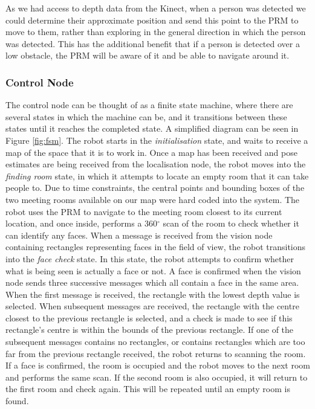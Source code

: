 \documentclass[conference]{IEEEtran}
\begin{document}
As we had access to depth data from the Kinect, when a person was detected we could determine their approximate position and send this point to the PRM to move to them, rather than exploring in the general direction in which the person was detected. This has the additional benefit that if a person is detected over a low obstacle, the PRM will be aware of it and be able to navigate around it.
\subsubsection{Control Node}
The control node can be thought of as a finite state machine, where there are several states in which the machine can be, and it transitions between these states until it reaches the completed state. A simplified diagram can be seen in Figure \ref{fig:fsm}. The robot starts in the \emph{initialisation} state, and waits to receive a map of the space that it is to work in. Once a map has been received and pose estimates are being received from the localisation node, the robot moves into the \emph{finding room} state, in which it attempts to locate an empty room that it can take people to. Due to time constraints, the central points and bounding boxes of the two meeting rooms available on our map were hard coded into the system. The robot uses the PRM to navigate to the meeting room closest to its current location, and once inside, performs a 360$^\circ$ scan of the room to check whether it can identify any faces. When a message is received from the vision node containing rectangles representing faces in the field of view, the robot transitions into the \emph{face check} state. In this state, the robot attempts to confirm whether what is being seen is actually a face or not. A face is confirmed when the vision node sends three successive messages which all contain a face in the same area. When the first message is received, the rectangle with the lowest depth value is selected. When subsequent messages are received, the rectangle with the centre closest to the previous rectangle is selected, and a check is made to see if this rectangle's centre is within the bounds of the previous rectangle. If one of the subsequent messages contains no rectangles, or contains rectangles which are too far from the previous rectangle received, the robot returns to scanning the room. If a face is confirmed, the room is occupied and the robot moves to the next room and performs the same scan. If the second room is also occupied, it will return to the first room and check again. This will be repeated until an empty room is found.
\end{document}
